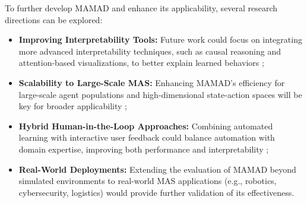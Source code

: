 \documentclass[pdflatex,sn-mathphys-num]{sn-jnl}%
\theoremstyle{thmstyleone}%
\theoremstyle{thmstyletwo}%
\theoremstyle{thmstylethree}%
\begin{document}
To further develop MAMAD and enhance its applicability, several research directions can be explored:
%
\begin{itemize}
    \item \textbf{Improving Interpretability Tools:} Future work could focus on integrating more advanced interpretability techniques, such as causal reasoning and attention-based visualizations, to better explain learned behaviors ;
    \item \textbf{Scalability to Large-Scale MAS:} Enhancing MAMAD's efficiency for large-scale agent populations and high-dimensional state-action spaces will be key for broader applicability ;
    \item \textbf{Hybrid Human-in-the-Loop Approaches:} Combining automated learning with interactive user feedback could balance automation with domain expertise, improving both performance and interpretability ;
    \item \textbf{Real-World Deployments:} Extending the evaluation of MAMAD beyond simulated environments to real-world MAS applications (e.g., robotics, cybersecurity, logistics) would provide further validation of its effectiveness.
\end{itemize}





\end{document}
